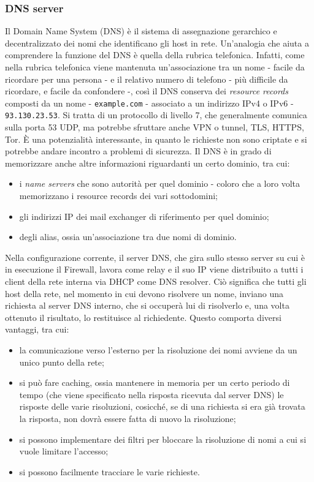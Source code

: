\subsubsection{DNS server}
Il Domain Name System (DNS) è il sistema di assegnazione gerarchico e decentralizzato dei nomi che identificano gli host in rete. Un'analogia che aiuta a comprendere la funzione del DNS è quella della rubrica telefonica.
Infatti, come nella rubrica telefonica viene mantenuta un'associazione tra un nome - facile da ricordare per una persona -  e il relativo numero di telefono - più difficile da ricordare, e facile da confondere -, così il DNS conserva dei \emph{resource records} composti da un nome - \texttt{example.com} - associato a un indirizzo IPv4 o IPv6 -  \texttt{93.130.23.53}.
Si tratta di un protocollo di livello 7, che generalmente comunica sulla porta 53 UDP, ma potrebbe sfruttare anche VPN o tunnel, TLS, HTTPS, Tor. È una potenzialità interessante, in quanto le richieste non sono criptate e si potrebbe andare incontro a problemi di sicurezza.
Il DNS è in grado di memorizzare anche altre informazioni riguardanti un certo dominio, tra cui:
\begin{itemize}
    \item i \emph{name servers} che sono autorità per quel dominio - coloro che a loro volta memorizzano i resource records dei vari sottodomini;
    \item gli indirizzi IP dei mail exchanger di riferimento per quel dominio;
    \item degli alias, ossia un'associazione tra due nomi di dominio.
\end{itemize}
Nella configurazione corrente, il server DNS, che gira sullo stesso server su cui è in esecuzione il Firewall, lavora come relay e il suo IP viene distribuito a tutti i client della rete interna via DHCP come DNS resolver.
Ciò significa che tutti gli host della rete, nel momento in cui devono risolvere un nome, inviano una richiesta al server DNS interno, che si occuperà lui di risolverlo e, una volta ottenuto il risultato, lo restituisce al richiedente.
Questo comporta diversi vantaggi, tra cui:
\begin{itemize}
    \item la comunicazione verso l'esterno per la risoluzione dei nomi avviene da un unico punto della rete;
    \item si può fare caching, ossia mantenere in memoria per un certo periodo di tempo (che viene specificato nella risposta ricevuta dal server DNS) le risposte delle varie risoluzioni, cosicché, se di una richiesta si era già trovata la risposta, non dovrà essere fatta di nuovo la risoluzione;
    \item si possono implementare dei filtri per bloccare la risoluzione di nomi a cui si vuole limitare l'accesso;
    \item si possono facilmente tracciare le varie richieste.
\end{itemize}

